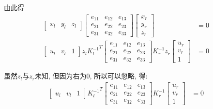 由此得
\begin{align*}
    \begin{bmatrix}
        x_l&y_l&z_l
    \end{bmatrix}
    \begin{bmatrix}
        e_{11} & e_{12} & e_{13} \\
        e_{21} & e_{22} & e_{23} \\
        e_{31} & e_{32} & e_{33}
    \end{bmatrix}\begin{bmatrix}
        x_r\\y_r\\z_r
    \end{bmatrix}&=0\\
    \begin{bmatrix}
        u_l&v_l&1
    \end{bmatrix}z_l {K_l^{-1}}^T\begin{bmatrix}
        e_{11} & e_{12} & e_{13} \\
        e_{21} & e_{22} & e_{23} \\
        e_{31} & e_{32} & e_{33}
    \end{bmatrix}K_r^{-1} z_r \begin{bmatrix}
        u_{r} \\
        v_{r} \\
        1
    \end{bmatrix}&=0
\end{align*}

虽然$z_l$与$z_r$未知, 但因为右为0, 所以可以忽略, 得: 
\begin{align*}
    \begin{bmatrix}
        u_l&v_l&1
    \end{bmatrix}{K_l^{-1}}^T\begin{bmatrix}
        e_{11} & e_{12} & e_{13} \\
        e_{21} & e_{22} & e_{23} \\
        e_{31} & e_{32} & e_{33}
    \end{bmatrix}K_r^{-1}\begin{bmatrix}
        u_{r} \\
        v_{r} \\
        1
    \end{bmatrix}&=0\\
\end{align*}


